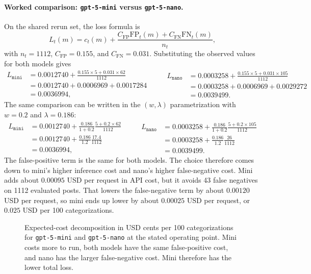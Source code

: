 \paragraph{Worked comparison: \texttt{gpt-5-mini} versus \texttt{gpt-5-nano}.}
On the shared rerun set, the loss formula is
\[
    L_t(m)
    =
    c_t(m)
    +
    \frac{
        C_{\mathrm{FP}}\mathrm{FP}_t(m)
        +C_{\mathrm{FN}}\mathrm{FN}_t(m)
    }{n_t},
\]
with \(n_t=1112\), \(C_{\mathrm{FP}}=0.155\), and \(C_{\mathrm{FN}}=0.031\). Substituting the observed values for both models gives
\[
\begin{aligned}
L_{\texttt{mini}}
&=
0.0012740
+
\frac{0.155\times5+0.031\times62}{1112}\\
&=
0.0012740
+
0.0006969
+
0.0017284\\
&=
0.0036994,
\end{aligned}
\qquad
\begin{aligned}
L_{\texttt{nano}}
&=
0.0003258
+
\frac{0.155\times5+0.031\times105}{1112}\\
&=
0.0003258
+
0.0006969
+
0.0029272\\
&=
0.0039499.
\end{aligned}
\]
The same comparison can be written in the \((w,\lambda)\) parametrization with \(w=0.2\) and \(\lambda=0.186\):
\[
\begin{aligned}
L_{\texttt{mini}}
&=
0.0012740
+
\frac{0.186}{1+0.2}
\frac{5+0.2\times62}{1112}\\
&=
0.0012740
+
\frac{0.186}{1.2}
\frac{17.4}{1112}\\
&=
0.0036994,
\end{aligned}
\qquad
\begin{aligned}
L_{\texttt{nano}}
&=
0.0003258
+
\frac{0.186}{1+0.2}
\frac{5+0.2\times105}{1112}\\
&=
0.0003258
+
\frac{0.186}{1.2}
\frac{26}{1112}\\
&=
0.0039499.
\end{aligned}
\]
The false-positive term is the same for both models. The choice therefore comes down to mini's higher inference cost and nano's higher false-negative cost. Mini adds about \(0.00095\) USD per request in API cost, but it avoids 43 false negatives on 1112 evaluated posts. That lowers the false-negative term by about \(0.00120\) USD per request, so mini ends up lower by about \(0.00025\) USD per request, or \(0.025\) USD per 100 categorizations.

\begin{figure}[htbp]
    \centering
    
    \caption[Mini-versus-nano expected-cost decomposition]{Expected-cost decomposition in USD cents per 100 categorizations for \texttt{gpt-5-mini} and \texttt{gpt-5-nano} at the stated operating point. Mini costs more to run, both models have the same false-positive cost, and nano has the larger false-negative cost. Mini therefore has the lower total loss.}
    \label{fig:mini-nano-tradeoff}
\end{figure}

